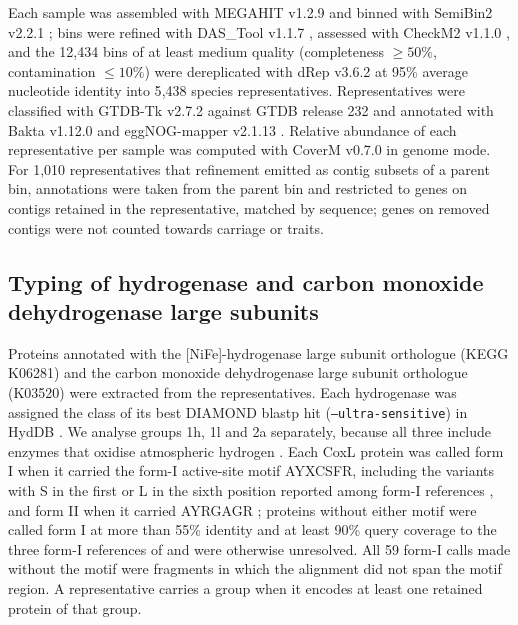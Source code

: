 \documentclass[11pt]{article}
\begin{document}
Each sample was assembled with MEGAHIT v1.2.9 \citep{li2015megahit} and binned with SemiBin2 v2.2.1
\citep{pan2023semibin2}; bins were refined with DAS\_Tool v1.1.7 \citep{sieber2018dastool}, assessed with
CheckM2 v1.1.0 \citep{chklovski2023checkm2}, and the 12{,}434 bins of at least medium quality
(completeness $\geq 50\%$, contamination $\leq 10\%$) were dereplicated with dRep v3.6.2
\citep{olm2017drep} at 95\% average nucleotide identity into 5{,}438 species representatives.
Representatives were classified with GTDB-Tk v2.7.2 \citep{chaumeil2022gtdbtk} against GTDB release 232
\citep{parks2022gtdb} and annotated with Bakta v1.12.0 \citep{schwengers2021bakta} and eggNOG-mapper
v2.1.13 \citep{cantalapiedra2021eggnog}. Relative abundance of each representative per sample was
computed with CoverM v0.7.0 \citep{aroney2025coverm} in genome mode. For 1{,}010 representatives that
refinement emitted as contig subsets of a parent bin, annotations were taken from the parent bin and
restricted to genes on contigs retained in the representative, matched by sequence; genes on removed
contigs were not counted towards carriage or traits.

\subsection*{Typing of hydrogenase and carbon monoxide dehydrogenase large subunits}
Proteins annotated with the [NiFe]-hydrogenase large subunit orthologue (KEGG K06281) and the carbon
monoxide dehydrogenase large subunit orthologue (K03520) were extracted from the representatives. Each
hydrogenase was assigned the class of its best DIAMOND blastp hit (\texttt{--ultra-sensitive}) in HydDB
\citep{sondergaard2016hyddb,greening2016genomic}. We analyse groups 1h, 1l and 2a separately, because all
three include enzymes that oxidise atmospheric hydrogen \citep{greening2016genomic,islam2020group2a}. Each
CoxL protein was called form I when it carried the form-I active-site motif AYXCSFR, including the
variants with S in the first or L in the sixth position reported among form-I references
\citep{imaura2026coxl}, and form II when it carried AYRGAGR
\citep{king2007coox,martincuadrado2009coxl,cunliffe2011roseobacter}; proteins without either motif were
called form I at more than 55\% identity and at least 90\% query coverage to the three form-I references of
\citet{cordero2019atmospheric} and were otherwise unresolved. All 59 form-I calls made without the motif were
fragments in which the alignment did not span the motif region. A representative carries a group when it
encodes at least one retained protein of that group.
\end{document}
